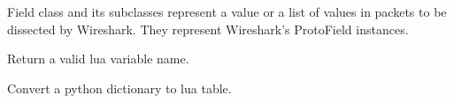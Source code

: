 \documentclass[A4paper,10pt,english]{sphinxmanual}
\begin{document}
Field class and its subclasses represent a value or a list of values in
packets to be dissected by Wireshark. They represent Wireshark's
ProtoField instances.

\begin{fulllineitems}
\label{devel/code:field.create_lua_var}
Return a valid lua variable name.

\end{fulllineitems}


\begin{fulllineitems}
\label{devel/code:field.create_lua_valuestring}
Convert a python dictionary to lua table.

\end{fulllineitems}

\end{document}
